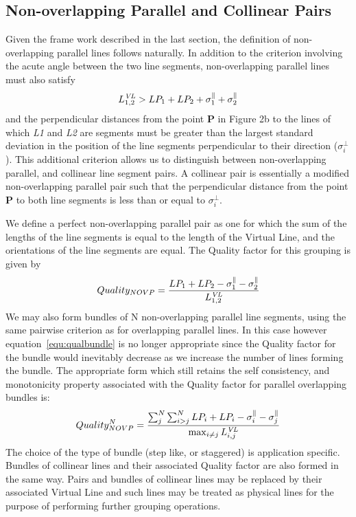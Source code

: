 \subsection{Non-overlapping Parallel and Collinear Pairs}

 Given the frame work described in the last section, the definition of
non-overlapping parallel lines follows naturally. In addition to the criterion
involving the acute angle between the two line segments, non-overlapping 
parallel lines must also satisfy 
\vspace{-2mm}
\begin{equation}
 L^{\it VL}_{1,2} > LP_{1} + LP_{2} + 
          \sigma^{\parallel}_{1} + \sigma^{\parallel}_{2}
\end{equation}
\vspace{-2mm}
and the perpendicular distances from the point {\bf P} in 
Figure 2b to the lines of which {\it L1} and {\it L2} are
segments must be greater than the largest standard deviation in the position 
of the line segments perpendicular to their direction ($\sigma^{\perp}_{i}$). 
This additional criterion allows us to distinguish between non-overlapping 
parallel, and collinear line segment pairs. A collinear pair is essentially a 
modified non-overlapping parallel pair such that the perpendicular distance 
from the point {\bf P} to both line segments is less than or equal to 
$\sigma^{\perp}_{i}$.

 We define a perfect non-overlapping parallel pair as one for which the sum of 
the lengths of the line segments is equal to the length of the Virtual Line,
and the orientations of the line segments are equal. The Quality factor for 
this grouping is given by 
\vspace{-2mm}
\begin{equation}
 Quality_{NOVP} = 
\frac 
{ LP_{1} + LP_{2} - \sigma^{\parallel}_{1} - \sigma^{\parallel}_{2} }
{ L^{\it VL}_{1,2} }
\end{equation}
\vspace{-2mm}
 We may also form bundles of N non-overlapping parallel line segments, using 
the same pairwise criterion as for overlapping parallel lines. In this case 
however equation~\ref{equ:qualbundle} is no longer appropriate since the 
Quality factor for the bundle would inevitably decrease as we increase the 
number of lines forming the bundle. The appropriate form which still retains 
the self consistency, and monotonicity property associated with the Quality 
factor for parallel overlapping bundles is:
\vspace{-2mm}
\begin{equation}
 Quality_{NOVP}^{N} = 
\frac { \sum^{N}_{j} \sum^{N}_{i>j} LP_{i} + LP_{i} - 
        \sigma^{\parallel}_{i} - \sigma^{\parallel}_{j} }
{
\max_{i \neq j} {L^{\it VL}_{i,j}}
}
\end{equation}
\vspace{-2mm}
 The choice of the type of bundle (step like, or staggered) is application 
specific. Bundles of collinear lines and their associated Quality 
factor are also formed in the same way. Pairs and bundles of collinear lines 
may be replaced by their associated Virtual Line and such lines 
may be treated as physical lines for the purpose of performing further 
grouping operations.

